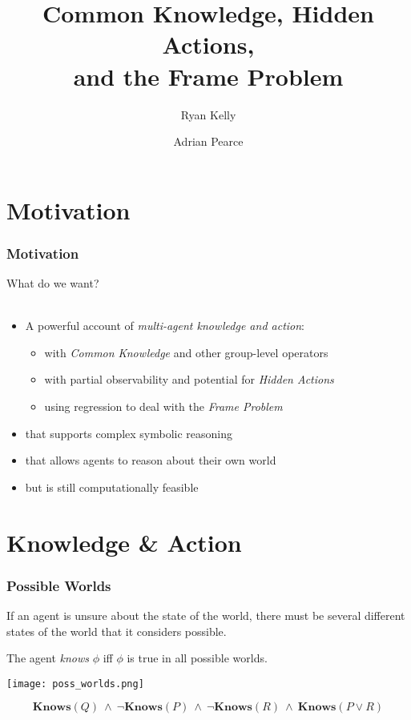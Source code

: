 \documentclass{beamer}
\title{Common Knowledge, Hidden Actions,\\ and the Frame Problem}
\author[Ryan Kelly (rfk@csse.unimelb.edu.au)]{Ryan Kelly \and Adrian Pearce}
\begin{document}
\begin{frame}
  \titlepage
\end{frame}

\section{Motivation}

\begin{frame}
\frametitle{Motivation}
What do we want?\ \\
\ \\
\begin{itemize}
\item A powerful account of \emph{multi-agent knowledge and action}:
  \begin{itemize}
    \item with \emph{Common Knowledge} and other group-level operators
    \item with partial observability and potential for \emph{Hidden Actions}
    \item using regression to deal with the \emph{Frame Problem}
  \end{itemize}
\item that supports complex symbolic reasoning
\item that allows agents to reason about their own world
\item but is still computationally feasible
\end{itemize}
\end{frame}

\section{Knowledge \& Action}

\begin{frame}
\frametitle{Possible Worlds}

If an agent is unsure about the state of the world, there must be several
different states of the world that it considers possible.

The agent \emph{knows} $\phi$ iff $\phi$ is true in all possible worlds.
\begin{center}
  \texttt{[image: poss\_worlds.png]}
\end{center}
\begin{equation*}
\mathbf{Knows}(Q)\ \wedge\ \neg\mathbf{Knows}(P)\ \wedge\ \neg\mathbf{Knows}(R)\ \wedge\ \mathbf{Knows}(P \vee R)
\end{equation*}

\end{frame}
\end{document}

